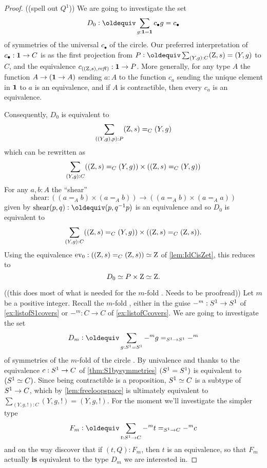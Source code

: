   \begin{proof}
  ((spell out $Q^1$))
We are going to investigate the set 
$$D_0\defequi\sum_{g:\bn 1=\bn 1}c_\bullet g=c_\bullet$$ 
of symmetries of the universal \covering $c_\bullet$ of the circle.  
Our preferred interpretation of $c_\bullet:\mathbf{1}\to C$ is as the first projection from $P\defequi\sum_{(Y,g):C}(\zet,s)=(Y,g)$ to $C$, and the equivalence $c_{((\mathrm{Z},s),\mathop{{\it refl}_{}})}:\mathbf{1}\to P$. %
More generally, for any type $A$ the function $A\to(\mathbf{1}\to A)$ sending $a:A$ to the function $c_a$ sending the unique element in $\mathbf{1}$ to $a$ is an equivalence, and if $A$ is contractible, then every $c_a$ is an equivalence.

   Consequently, $D_0$ is equivalent to
$$\sum_{((Y,g),p):P}(\mathrm{Z},s)=_C(Y,g)$$ 
which can be rewritten as
$$\sum_{(Y,g):C}((\mathrm{Z},s)=_C(Y,g))\times((\mathrm{Z},s)=_C(Y,g))
$$
For any $a,b:A$ the ``shear'' 
$$\mathrm{shear}:((a=_Ab)\times(a=_Ab))\to((a=_Ab)\times(a=_Aa))$$ 
given by $\mathrm{shear}(p,q)\defequi(p,q^{-1}p)$
is an equivalence and
so $D_0$ is equivalent to 
$$\sum_{(Y,g):C}((\mathrm{Z},s)=_C(Y,g))\times ((\mathrm{Z},s)=_C(\mathrm{Z},s)).
$$
Using the equivalence $\mathrm{ev}_0:((\mathrm{Z},s)=_C(\mathrm{Z},s))\simeq\mathrm{Z}$ of \cref{lem:IdCisZet}, this
 reduces to 
$$D_0\simeq P\times\mathrm{Z}\simeq\mathrm{Z}.$$
    
((this does most of what is needed for the $m$-fold \covering.  Needs to be proofread))
    Let $m$ be a positive integer.  
Recall the $m$-fold \covering, either in the guise $-^m:S^1\to S^1$ of \cref{ex:listofS1covers} or $-^m:C\to C$ of \cref{ex:listofCcovers}.
We are going to investigate the set
$$D_m\defequi\sum_{g:\Sc=\Sc}-^mg=_{\Sc\to \Sc}-^m$$  
of symmetries of the $m$-fold \covering of the circle%
.  
By univalence and thanks to the equivalence $c:S^1\to C$ of \cref{thm:S1bysymmetries} $(S^1= S^1)$ is equivalent to $(S^1\simeq C)$.
Since being contractible is a proposition, $S^1\simeq C$ is a subtype of $S^1\to C$,
which by \cref{lem:freeloopspace} is ultimately equivalent to $\sum_{(Y,g,!):C}(Y,g,!)=(Y,g,!)$. 
For the moment we'll investigate the simpler type 
$$F_m\defequi\sum_{t:\Sc\to C}-^mt=_{\Sc\to C}-^mc$$
and on the way discover that if $(t,Q):F_m$, then $t$ is an equivalence, so that $F_m$ actually {\bf is} equivalent to the type $D_m$ we are interested in.


\end{proof}
